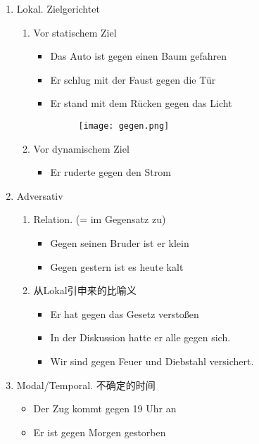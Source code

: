 \documentclass[UTF8]{report}
\begin{document}
\begin{enumerate}
    \item Lokal. Zielgerichtet
    \begin{enumerate}
        \item Vor statischem Ziel
        \begin{itemize}
            \item Das Auto ist gegen einen Baum gefahren
            \item Er schlug mit der Faust gegen die Tür
            \item Er stand mit dem Rücken gegen das Licht
            \begin{figure}[H]
                \centering
                \texttt{[image: gegen.png]}
            \end{figure}
        \end{itemize}
        \item Vor dynamischem Ziel
        \begin{itemize}
            \item Er ruderte gegen den Strom
        \end{itemize}
    \end{enumerate}
    \item Adversativ
    \begin{enumerate}
        \item Relation. (= im Gegensatz zu)
        \begin{itemize}
            \item Gegen seinen Bruder ist er klein
            \item Gegen gestern ist es heute kalt
        \end{itemize}
        \item 从Lokal引申来的比喻义
        \begin{itemize}
            \item Er hat gegen das Gesetz verstoßen
            \item In der Diskussion hatte er alle gegen sich.
            \item Wir sind gegen Feuer und Diebstahl versichert.
        \end{itemize}
    \end{enumerate}
    \item Modal/Temporal. 不确定的时间
    \begin{itemize}
        \item Der Zug kommt gegen 19 Uhr an
        \item Er ist gegen Morgen gestorben
    \end{itemize}
\end{enumerate}
\end{document}
